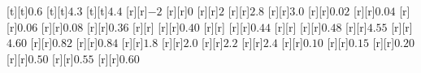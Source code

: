 \begin{psfrags}
[t][t]{$0.6$}%
[t][t]{$4.3$}%
[t][t]{$4.4$}%
%
[r][r]{$-2$}%
[r][r]{$0$}%
[r][r]{$2$}%
[r][r]{$2.8$}%
[r][r]{$3.0$}%
[r][r]{$0.02$}%
[r][r]{$0.04$}%
[r][r]{$0.06$}%
[r][r]{$0.08$}%
[r][r]{$0.36$}%
[r][r]{}%
[r][r]{$0.40$}%
[r][r]{}%
[r][r]{$0.44$}%
[r][r]{}%
[r][r]{$0.48$}%
[r][r]{$4.55$}%
[r][r]{$4.60$}%
[r][r]{$0.82$}%
[r][r]{$0.84$}%
[r][r]{$1.8$}%
[r][r]{$2.0$}%
[r][r]{$2.2$}%
[r][r]{$2.4$}%
[r][r]{$0.10$}%
[r][r]{$0.15$}%
[r][r]{$0.20$}%
[r][r]{$0.50$}%
[r][r]{$0.55$}%
[r][r]{$0.60$}%
%
%
\end{psfrags}%
%
